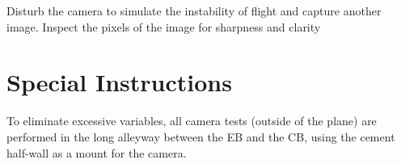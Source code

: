 \documentclass[]{auvsi_doc}
\begin{document}
Disturb the camera to simulate the instability of flight and capture another image. Inspect the pixels of the image for sharpness and clarity

\section{Special Instructions}

To eliminate excessive variables, all camera tests (outside of the plane) are performed in the long alleyway between the EB and the CB, using the cement half-wall as a mount for the camera.
\end{document}
